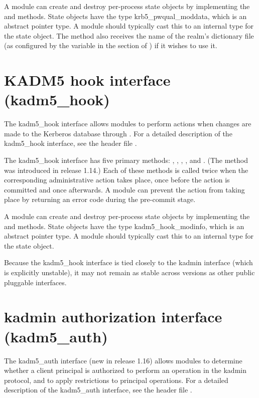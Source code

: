 \documentclass[letterpaper,10pt,english]{sphinxmanual}
\begin{document}
A module can create and destroy per-process state objects by
implementing the  and  methods.  State objects have
the type krb5\_pwqual\_moddata, which is an abstract pointer type.  A
module should typically cast this to an internal type for the state
object.  The  method also receives the name of the realm’s
dictionary file (as configured by the  variable in the
 section of ) if it wishes to use
it.


\section{KADM5 hook interface (kadm5\_hook)}
\label{\detokenize{plugindev/kadm5_hook:kadm5-hook-interface-kadm5-hook}}\label{\detokenize{plugindev/kadm5_hook::doc}}\label{\detokenize{plugindev/kadm5_hook:kadm5-hook-plugin}}
The kadm5\_hook interface allows modules to perform actions when
changes are made to the Kerberos database through .
For a detailed description of the kadm5\_hook interface, see the header
file .

The kadm5\_hook interface has five primary methods: ,
, , , and .  (The 
method was introduced in release 1.14.)  Each of these methods is
called twice when the corresponding administrative action takes place,
once before the action is committed and once afterwards.  A module can
prevent the action from taking place by returning an error code during
the pre-commit stage.

A module can create and destroy per-process state objects by
implementing the  and  methods.  State objects have
the type kadm5\_hook\_modinfo, which is an abstract pointer type.  A
module should typically cast this to an internal type for the state
object.

Because the kadm5\_hook interface is tied closely to the kadmin
interface (which is explicitly unstable), it may not remain as stable
across versions as other public pluggable interfaces.


\section{kadmin authorization interface (kadm5\_auth)}
\label{\detokenize{plugindev/kadm5_auth:kadm5-auth-plugin}}\label{\detokenize{plugindev/kadm5_auth:kadmin-authorization-interface-kadm5-auth}}\label{\detokenize{plugindev/kadm5_auth::doc}}
The kadm5\_auth interface (new in release 1.16) allows modules to
determine whether a client principal is authorized to perform an
operation in the kadmin protocol, and to apply restrictions to
principal operations.  For a detailed description of the kadm5\_auth
interface, see the header file .
\end{document}
